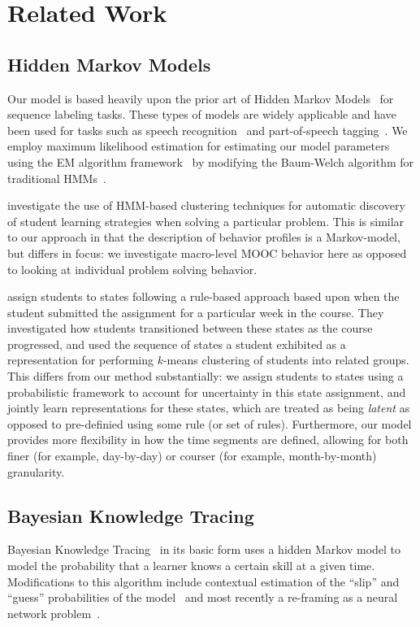 \section{Related Work}

\subsection{Hidden Markov Models}
Our model is based heavily upon the prior art of Hidden Markov
Models~\cite{Rabiner:1990:RSR} for sequence labeling tasks. These types of
models are widely applicable and have been used for tasks such as speech
recognition~\cite{Huang:1990:HMM} and part-of-speech
tagging~\cite{Jurafsky:2009:SLP}. We employ maximum likelihood estimation
for estimating our model parameters using the EM algorithm
framework~\cite{Dempster:1977:JRSS} by modifying the Baum-Welch algorithm
for traditional HMMs~\cite{Rabiner:1990:RSR}.

\citet{Shih:2010:EDM} investigate the use of HMM-based clustering
techniques for automatic discovery of student learning strategies when
solving a particular problem. This is similar to our approach in that the
description of behavior profiles is a Markov-model, but differs in focus:
we investigate macro-level MOOC behavior here as opposed to looking at
individual problem solving behavior.

\citet{Kizilcec:2013:LAK} assign students to states following a rule-based
approach based upon when the student submitted the assignment for a
particular week in the course. They investigated how students transitioned
between these states as the course progressed, and used the sequence of
states a student exhibited as a representation for performing $k$-means
clustering of students into related groups. This differs from our method
substantially: we assign students to states using a probabilistic
framework to account for uncertainty in this state assignment, and jointly
learn representations for these states, which are treated as being
\emph{latent} as opposed to pre-definied using some rule (or set of rules).
Furthermore, our model provides more flexibility in how the time segments
are defined, allowing for both finer (for example, day-by-day) or courser
(for example, month-by-month) granularity.

\subsection{Bayesian Knowledge Tracing}
Bayesian Knowledge Tracing~\cite{Corbett:1994:UMUAI} in its basic form uses
a hidden Markov model to model the probability that a learner knows a
certain skill at a given time. Modifications to this algorithm include
contextual estimation of the ``slip'' and ``guess'' probabilities of the
model~\cite{Baker:2008:ITS} and most recently a re-framing as a neural
network problem~\cite{Piech:2015:NIPS}.

